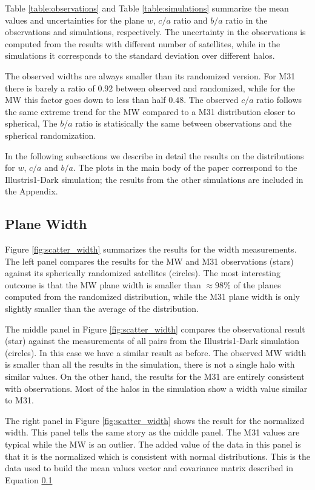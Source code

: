 \documentclass[a4paper,fleqn,usenatbib]{mnras}
\begin{document}
Table \ref{table:observations} and Table \ref{table:simulations}
summarize the mean values and uncertainties for the plane $w$, $c/a$
ratio and $b/a$ ratio in the observations and simulations, respectively. 
The uncertainty in the observations is computed from the results with
different number of satellites, while in the simulations it
corresponds to the standard deviation over different halos. 

The observed widths are always smaller than its randomized version.
For M31 there is barely a ratio of $0.92$ between observed and
randomized, while for the MW this factor goes down to less than half
$0.48$. 
The observed $c/a$ ratio follows the same extreme trend for
the MW compared to a M31 distribution closer to spherical, 
The $b/a$ ratio is statisically the same between observations and the
spherical randomization. 


In the following subsections we describe in detail the results on the 
distributions for $w$, $c/a$ and $b/a$. 
The plots in the main body of the paper correspond to the
Illustris1-Dark simulation; the results from the other simulations are
included in the Appendix.

\subsection{Plane Width}

Figure \ref{fig:scatter_width} summarizes the results for the width
measurements.
The left panel compares the results for the MW and M31
observations (stars) against its spherically randomized satellites
(circles). 
The most interesting outcome is that the MW plane width is smaller
than $\approx 98\%$ of the planes computed from the randomized distribution,
while the M31 plane width is only slightly smaller than the average of
the distribution.

The middle panel in Figure \ref{fig:scatter_width} compares the
observational result (star) against the measurements of all pairs from the Illustris1-Dark
simulation (circles).
In this case we have a similar result as before. 
The observed MW width is smaller than all the results in the
simulation, there is not a single halo with similar values.
On the other hand, the results for the M31 are entirely consistent
with observations. Most of the halos in the simulation show a width
value similar to M31. 

The right panel in Figure \ref{fig:scatter_width} shows the result for
the normalized width.  
This panel tells the same story as the middle panel. The M31 values
are typical while the MW is an outlier. 
The added value of the data in this panel is that it is the normalized
which is consistent with normal distributions.
This is the data used to build the mean values vector and covariance
matrix described in Equation \ref{} 
\end{document}
